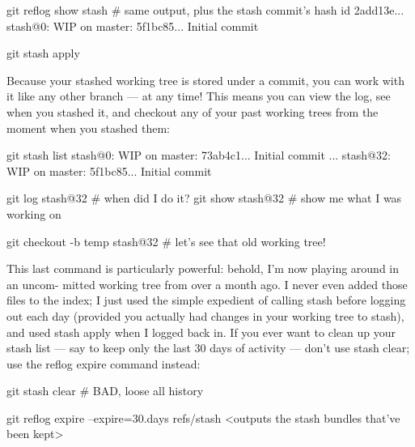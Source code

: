 \documentclass{report}
\begin{document}
\begin{itemize}
\begin{bashcode}
                git reflog show stash # same output, plus the stash commit's hash id
                2add13e... stash@{0}: WIP on master: 5f1bc85... Initial commit

                git stash apply
            \end{bashcode}
            \bigbreak \noindent 
            Because your stashed working tree is stored under a commit, you can work with it like any other branch — at any time! This means you can view the log, see when you stashed it, and checkout any of your past working trees from the moment when you stashed them:
            \bigbreak \noindent 
            \begin{bashcode}
                git stash list
                stash@{0}: WIP on master: 73ab4c1... Initial commit
                ...
                stash@{32}: WIP on master: 5f1bc85... Initial commit

                git log stash@{32} # when did I do it?
                git show stash@{32} # show me what I was working on

                git checkout -b temp stash@{32} # let’s see that old working tree!
            \end{bashcode}
            \bigbreak \noindent 
            This last command is particularly powerful: behold, I’m now playing around in an uncom- mitted working tree from over a month ago. I never even added those files to the index; I just used the simple expedient of calling stash before logging out each day (provided you actually had changes in your working tree to stash), and used stash apply when I logged back in.
            \bigbreak \noindent 
            If you ever want to clean up your stash list — say to keep only the last 30 days of activity — don’t use stash clear; use the reflog expire command instead:
            \bigbreak \noindent 
            \begin{bashcode}
            git stash clear # BAD, loose all history

            git reflog expire --expire=30.days refs/stash
            <outputs the stash bundles that've been kept>
            \end{bashcode}


    \end{itemize}

    \pagebreak 
\end{document}
